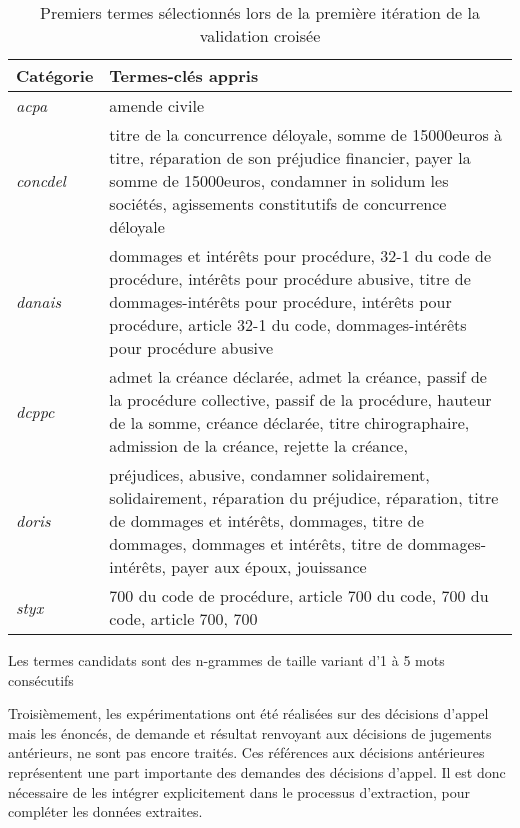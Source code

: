 \begin{table}[!htb]
		\centering\scriptsize
	\begin{tabular}{|l|p{}|}
		\hline
		\textbf{Catégorie} & \textbf{Termes-clés appris} \\ \hline
		\textit{acpa}    & amende civile                                                                                                                                                                                                                               \\ \hline
		\textit{concdel} & titre de la concurrence déloyale, somme de 15000euros à titre, réparation de son préjudice financier, payer la somme de 15000euros, condamner in solidum les sociétés, agissements constitutifs de concurrence déloyale                   \\ \hline
		\textit{danais}  & dommages et intérêts pour procédure, 32-1 du code de procédure, intérêts pour procédure abusive, titre de dommages-intérêts pour procédure, intérêts pour procédure, article 32-1 du code, dommages-intérêts pour procédure abusive         \\ \hline
		\textit{dcppc}   & admet la créance déclarée, admet la créance, passif de la procédure collective, passif de la procédure, hauteur de la somme, créance déclarée, titre chirographaire, admission de la créance, rejette la créance,                           \\ \hline
		\textit{doris}   & préjudices, abusive, condamner solidairement, solidairement, réparation du préjudice, réparation, titre de dommages et intérêts, dommages, titre de dommages, dommages et intérêts, titre de dommages-intérêts, payer aux époux, jouissance \\ \hline
		\textit{styx}    & 700 du code de procédure, article 700 du code, 700 du code, article 700, 700                                                                                                                                                                \\ \hline
	\end{tabular}
Les termes candidats sont des n-grammes de taille variant d'1 à 5 mots consécutifs
\caption{Premiers termes sélectionnés lors de la première itération de la validation croisée} \label{tab:quanta:exemples_termes}
\end{table}

Troisièmement, les expérimentations ont été réalisées sur des décisions d'appel mais les énoncés, de demande et résultat renvoyant aux décisions de jugements antérieurs, ne sont pas encore traités. Ces références aux décisions antérieures représentent une part importante des demandes des décisions d'appel. Il est donc nécessaire de les intégrer explicitement dans le processus d'extraction, pour compléter les données extraites.

